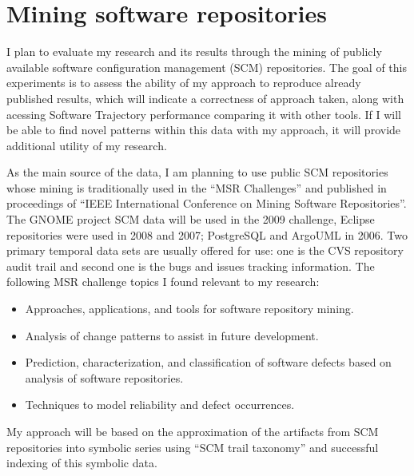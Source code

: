 \section{Mining software repositories}\label{public.evaluation}
I plan to evaluate my research and its results through the mining of publicly available software configuration management (SCM) repositories. The goal of this experiments is to assess the ability of my approach to reproduce already published results, which will indicate a correctness of approach taken, along with acessing Software Trajectory performance comparing it with other tools. If I will be able to find novel patterns within this data with my approach, it will provide additional utility of my research.

As the main source of the data, I am planning to use public SCM repositories whose mining is traditionally used in the ``MSR Challenges'' \cite{citeulike:5043676} and published in proceedings of ``IEEE International Conference on Mining Software Repositories''. The GNOME project SCM data will be used in the 2009 challenge, Eclipse repositories were used in 2008 and 2007; PostgreSQL and ArgoUML in 2006. Two primary temporal data sets are usually offered for use: one is the CVS repository audit trail and second one is the bugs and issues tracking information. The following MSR challenge topics I found relevant to my research:
\begin{itemize}
  \item Approaches, applications, and tools for software repository mining.
  \item Analysis of change patterns to assist in future development.
	\item Prediction, characterization, and classification of software defects based on analysis of software repositories.
	\item Techniques to model reliability and defect occurrences.
\end{itemize}
My approach will be based on the approximation of the artifacts from SCM repositories into symbolic series using ``SCM trail taxonomy'' and successful indexing of this symbolic data. 

